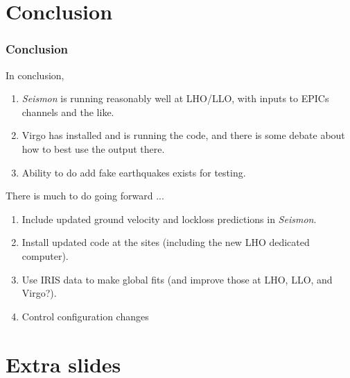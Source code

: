 \documentclass[ignorenonframetext,t,10pt]{beamer}
\begin{document}
\section{Conclusion}
\begin{frame}
  \frametitle{Conclusion}

In conclusion,
\begin{enumerate}
\item \emph{Seismon} is running reasonably well at LHO/LLO, with inputs to EPICs channels and the like. 
\item Virgo has installed and is running the code, and there is some debate about how to best use the output there.
\item Ability to do add fake earthquakes exists for testing.
\end{enumerate}

There is much to do going forward ...
\begin{enumerate}
\item Include updated ground velocity and lockloss predictions in \emph{Seismon}.
\item Install updated code at the sites (including the new LHO dedicated computer).
\item Use IRIS data to make global fits (and improve those at LHO, LLO, and Virgo?).
\item Control configuration changes
\end{enumerate}

\end{frame}

\section{Extra slides}
\end{document}
